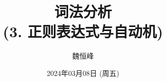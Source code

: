 \documentclass[]{beamer}
\title[词法分析]{词法分析 \\ (3. 正则表达式与自动机)}
\author[魏恒峰]{\large 魏恒峰}
\institute{hfwei@nju.edu.cn}
\date{2024年03月08日 (周五)}
\begin{document}
\maketitle




\thankyou{}

\end{document}
